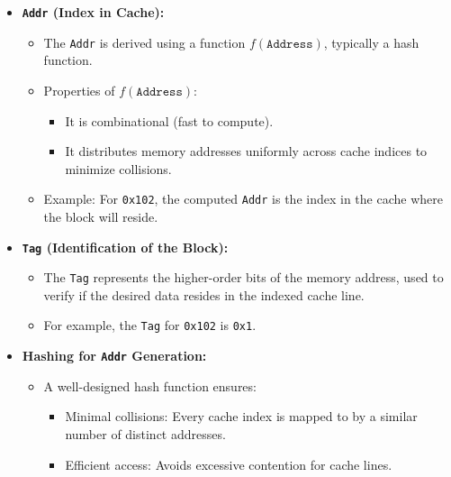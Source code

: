 \begin{itemize}
    \item \textbf{\texttt{Addr} (Index in Cache):}
    \begin{itemize}
        \item The \texttt{Addr} is derived using a function \( f(\texttt{Address}) \), typically a hash function.
        \item Properties of \( f(\texttt{Address}) \):
        \begin{itemize}
            \item It is combinational (fast to compute).
            \item It distributes memory addresses uniformly across cache indices to minimize collisions.
        \end{itemize}
        \item Example: For \texttt{0x102}, the computed \texttt{Addr} is the index in the cache where the block will reside.
    \end{itemize}

    \item \textbf{\texttt{Tag} (Identification of the Block):}
    \begin{itemize}
        \item The \texttt{Tag} represents the higher-order bits of the memory address, used to verify if the desired data resides in the indexed cache line.
        \item For example, the \texttt{Tag} for \texttt{0x102} is \texttt{0x1}.
    \end{itemize}

    \item \textbf{Hashing for \texttt{Addr} Generation:}
    \begin{itemize}
        \item A well-designed hash function ensures:
        \begin{itemize}
            \item Minimal collisions: Every cache index is mapped to by a similar number of distinct addresses.
            \item Efficient access: Avoids excessive contention for cache lines.
        \end{itemize}
    \end{itemize}
\end{itemize}

